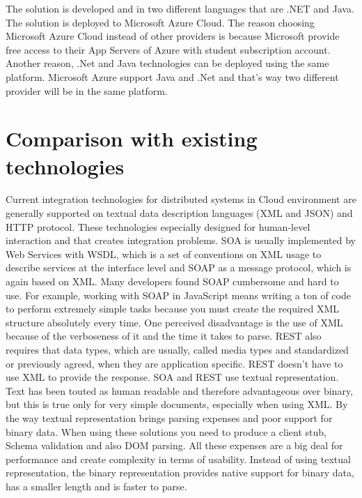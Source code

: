 \documentclass[runningheads,a4paper]{llncs}
\begin{document}
The solution is developed and in two different languages that are .NET and Java. The solution is deployed to Microsoft Azure Cloud. The reason choosing Microsoft Azure Cloud instead of other providers is because Microsoft provide free access to their App Servers of Azure with student subscription account. Another reason, .Net and Java technologies can be deployed using the same platform. Microsoft Azure support Java and .Net and that’s way two different provider will be in the same platform.

\section{Comparison with existing technologies}
Current integration technologies for distributed systems in Cloud environment are generally supported on textual data description languages (XML and JSON) and HTTP protocol. These technologies especially designed for human-level interaction and that creates integration problems.  SOA is usually implemented by Web Services with WSDL, which is a set of conventions on XML usage to describe services at the interface level and SOAP as a message protocol, which is again based on XML. Many developers found SOAP cumbersome and hard to use. For example, working with SOAP in JavaScript means writing a ton of code to perform extremely simple tasks because you must create the required XML structure absolutely every time. One perceived disadvantage is the use of XML because of the verboseness of it and the time it takes to parse. REST also requires that data types, which are usually, called media types and standardized or previously agreed, when they are application specific. REST doesn’t have to use XML to provide the response. SOA and REST use textual representation. Text has been touted as human readable and therefore advantageous over binary, but this is true only for very simple documents, especially when using XML. By the way textual representation brings parsing expenses and poor support for binary data. When using these solutions you need to produce a client stub, Schema validation and also DOM parsing. All these expenses are a big deal for performance and create complexity in terms of usability. Instead of using textual representation, the binary representation provides native support for binary data, has a smaller length and is faster to parse.
\end{document}
